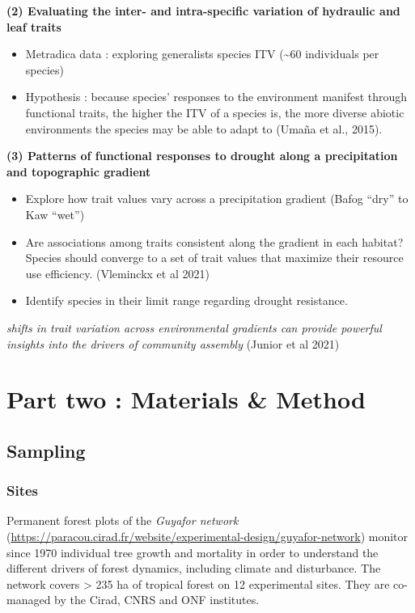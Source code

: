 \documentclass[
]{book}
\providecommand{\tightlist}{%
  \setlength{\itemsep}{0pt}\setlength{\parskip}{0pt}}
\begin{document}
\textbf{(2) Evaluating the inter- and intra-specific variation of hydraulic and leaf traits}

\begin{itemize}
\tightlist
\item
  Metradica data : exploring generalists species ITV (\textasciitilde60 individuals per species)
\item
  Hypothesis : because species' responses to the environment manifest through functional traits, the higher the ITV of a species is, the more diverse abiotic environments the species may be able to adapt to (Umaña et al., 2015).
\end{itemize}

\textbf{(3) Patterns of functional responses to drought along a precipitation and topographic gradient}

\begin{itemize}
\tightlist
\item
  Explore how trait values vary across a precipitation gradient (Bafog ``dry'' to Kaw ``wet'')
\item
  Are associations among traits consistent along the gradient in each habitat? Species should converge to a set of trait values that maximize their resource use efficiency. (Vleminckx et al 2021)
\item
  Identify species in their limit range regarding drought resistance.
\end{itemize}

\emph{shifts in trait variation across environmental gradients can provide powerful insights into the drivers of community assembly} (Junior et al 2021)

\hypertarget{part-part-two-materials-method}{%
\part{Part two : Materials \& Method}\label{part-part-two-materials-method}}

\hypertarget{sampling}{%
\chapter{Sampling}\label{sampling}}

\hypertarget{sites}{%
\section{Sites}\label{sites}}

Permanent forest plots of the \emph{Guyafor network} (\url{https://paracou.cirad.fr/website/experimental-design/guyafor-network}) monitor since 1970 individual tree growth and mortality in order to understand the different drivers of forest dynamics, including climate and disturbance. The network covers \textgreater{} 235 ha of tropical forest on 12 experimental sites. They are co-managed by the Cirad, CNRS and ONF institutes.
\end{document}
